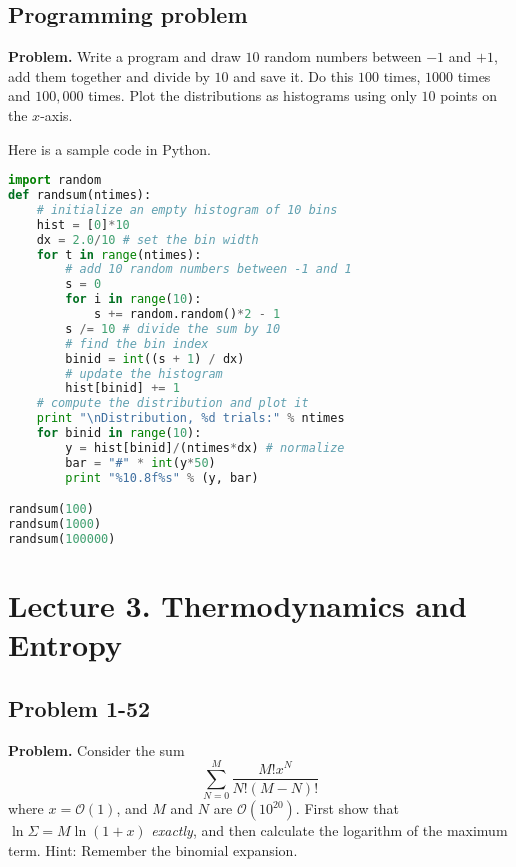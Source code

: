 \documentclass[twocolumn, 10pt]{article}
\numberwithin{equation}{section}
\newenvironment{problem}
{\par\medskip\sffamily \color{problue}
  \textbf{Problem. }\ignorespaces}
{\medskip}
\newenvironment{solution}[1][\empty]
{\par\medskip
  \textbf{\ifx\empty#1{Solution.}\relax\else{#1}\fi} \ignorespaces}
{\medskip}
\begin{document}
\subsection{Programming problem}

\begin{problem}
Write a program and draw $10$ random numbers between $-1$ and $+1$,
add them together and divide by $10$ and save it.
Do this $100$ times, $1000$ times and $100,000$ times.
Plot the distributions as histograms using only $10$ points on the $x$-axis.
\end{problem}

\begin{solution}
Here is a sample code in Python.
\begin{lstlisting}[language=Python]
import random
def randsum(ntimes):
    # initialize an empty histogram of 10 bins
    hist = [0]*10
    dx = 2.0/10 # set the bin width
    for t in range(ntimes):
        # add 10 random numbers between -1 and 1
        s = 0
        for i in range(10):
            s += random.random()*2 - 1
        s /= 10 # divide the sum by 10
        # find the bin index
        binid = int((s + 1) / dx)
        # update the histogram
        hist[binid] += 1
    # compute the distribution and plot it
    print "\nDistribution, %d trials:" % ntimes
    for binid in range(10):
        y = hist[binid]/(ntimes*dx) # normalize
        bar = "#" * int(y*50)
        print "%10.8f%s" % (y, bar)

randsum(100)
randsum(1000)
randsum(100000)
\end{lstlisting}
\end{solution}




\section{Lecture 3. Thermodynamics and Entropy}

\subsection{Problem 1-52}

\begin{problem}
  Consider the sum
  $$
  \sum_{N=0}^M \frac{ M! x^N } { N! (M-N)! }
  $$
  where $x = \mathcal O(1)$,
  and $M$ and $N$ are $\mathcal O(10^{20})$.
  First show that
  $\ln\Sigma = M \ln(1+x)$
  \emph{exactly}, and then calculate
  the logarithm of the maximum term.
  Hint: Remember the binomial expansion.
\end{problem}
\end{document}
